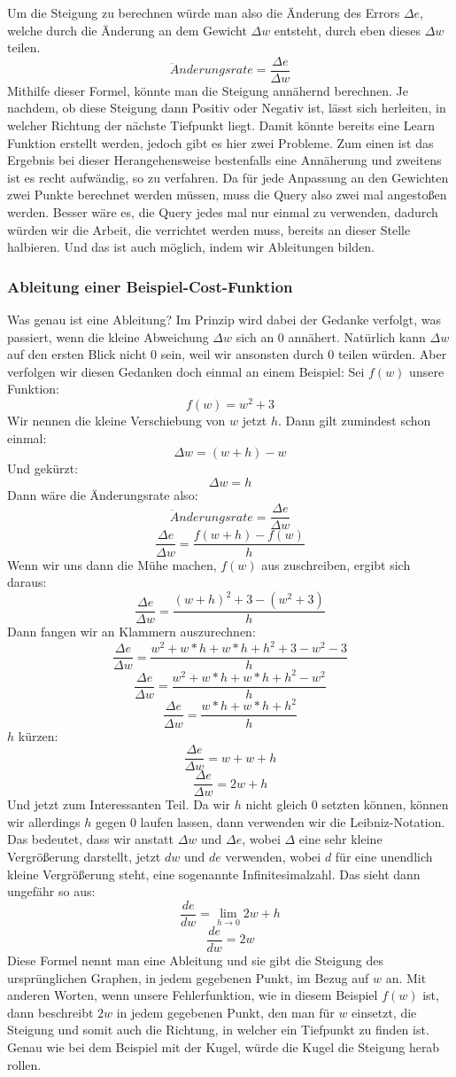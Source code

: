 \documentclass[12pt]{article}
\begin{document}
Um die Steigung zu berechnen würde man also die Änderung des Errors $\Delta e$, welche durch die Änderung an dem Gewicht $\Delta w$ entsteht, durch eben dieses $\Delta w$ teilen. $$\ddot{A}nderungsrate = \frac{\Delta e}{\Delta w}$$
Mithilfe dieser Formel, könnte man die Steigung annähernd berechnen. Je nachdem, ob diese Steigung dann Positiv oder Negativ ist, lässt sich herleiten, in welcher Richtung der nächste Tiefpunkt liegt. Damit könnte bereits eine Learn Funktion erstellt werden, jedoch gibt es hier zwei Probleme.
Zum einen ist das Ergebnis bei dieser Herangehensweise bestenfalls eine Annäherung und zweitens ist es recht aufwändig, so zu verfahren. Da für jede Anpassung an den Gewichten zwei Punkte berechnet werden müssen, muss die Query also zwei mal angestoßen werden. Besser wäre es, die Query jedes mal nur einmal zu verwenden, dadurch würden wir die Arbeit, die verrichtet werden muss, bereits an dieser Stelle halbieren. Und das ist auch möglich, indem wir Ableitungen bilden.
\subsubsection{Ableitung einer Beispiel-Cost-Funktion}
Was genau ist eine Ableitung? Im Prinzip wird dabei der Gedanke verfolgt, was passiert, wenn die kleine Abweichung $\Delta w$ sich an 0 annähert. Natürlich kann $\Delta w$ auf den ersten Blick nicht 0 sein, weil wir ansonsten durch 0 teilen würden. 
Aber verfolgen wir diesen Gedanken doch einmal an einem Beispiel:
Sei $f(w)$ unsere Funktion: $$f(w)=w^2+3$$
Wir nennen die kleine Verschiebung von $w$ jetzt $h$.
Dann gilt zumindest schon einmal: $$\Delta w=(w+h)-w$$Und gekürzt:$$\Delta w=h$$
Dann wäre die Änderungsrate also:$$\ddot{A}nderungsrate = \frac{\Delta e}{\Delta w}$$ $$\frac{\Delta e}{\Delta w}=\frac{f(w+h)-f(w)}{h}$$
Wenn wir uns dann die Mühe machen, $f(w)$ aus zuschreiben, ergibt sich daraus:
$$\frac{\Delta e}{\Delta w}=\frac{(w+h)^2+3-(w^2+3)}{h}$$
Dann fangen wir an Klammern auszurechnen:
$$\frac{\Delta e}{\Delta w}=\frac{w^2+w*h+w*h+h^2+3-w^2-3}{h}$$
$$\frac{\Delta e}{\Delta w}=\frac{w^2+w*h+w*h+h^2-w^2}{h}$$
$$\frac{\Delta e}{\Delta w}=\frac{w*h+w*h+h^2}{h}$$
$h$ kürzen:
$$\frac{\Delta e}{\Delta w}=w+w+h$$
$$\frac{\Delta e}{\Delta w}=2w+h$$Und jetzt zum Interessanten Teil. Da wir $h$ nicht gleich 0 setzten können, können wir allerdings $h$ gegen 0 laufen lassen, dann verwenden wir die Leibniz-Notation. Das bedeutet, dass wir anstatt  $\Delta w$ und  $\Delta e$, wobei $\Delta$ eine sehr kleine Vergrößerung darstellt, jetzt $dw$ und $de$ verwenden, wobei $d$ für eine unendlich kleine Vergrößerung steht, eine sogenannte Infinitesimalzahl.
Das sieht dann ungefähr so aus:
$$\frac{de}{dw}=\lim_{h\to 0} 2w +h$$
$$\frac{de}{dw}=2w$$
Diese Formel nennt man eine Ableitung und sie gibt die Steigung des ursprünglichen Graphen, in jedem gegebenen Punkt, im Bezug auf $w$ an. Mit anderen Worten, wenn unsere Fehlerfunktion, wie in diesem Beispiel $f(w)$ ist, dann beschreibt $2w$ in jedem gegebenen Punkt, den man für $w$ einsetzt, die Steigung und somit auch die Richtung, in welcher ein Tiefpunkt zu finden ist. Genau wie bei dem Beispiel mit der Kugel, würde die Kugel die Steigung herab rollen.
\end{document}
